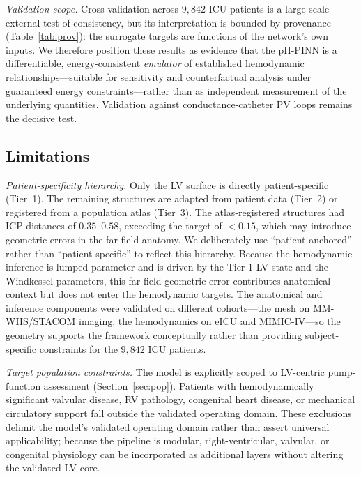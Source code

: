 \documentclass[journal]{IEEEtran}
\begin{document}
\emph{Validation scope.} Cross-validation across $9{,}842$ ICU patients is a large-scale external test of consistency, but its interpretation is bounded by provenance (Table~\ref{tab:prov}): the surrogate targets are functions of the network's own inputs. We therefore position these results as evidence that the pH-PINN is a differentiable, energy-consistent \emph{emulator} of established hemodynamic relationships---suitable for sensitivity and counterfactual analysis under guaranteed energy constraints---rather than as independent measurement of the underlying quantities. Validation against conductance-catheter PV loops remains the decisive test.

\subsection{Limitations}\label{sec:limits}
\emph{Patient-specificity hierarchy.} Only the LV surface is directly patient-specific (Tier~1). The remaining structures are adapted from patient data (Tier~2) or registered from a population atlas (Tier~3). The atlas-registered structures had ICP distances of $0.35$--$0.58$, exceeding the target of $<0.15$, which may introduce geometric errors in the far-field anatomy. We deliberately use ``patient-anchored'' rather than ``patient-specific'' to reflect this hierarchy. Because the hemodynamic inference is lumped-parameter and is driven by the Tier-1 LV state and the Windkessel parameters, this far-field geometric error contributes anatomical context but does not enter the hemodynamic targets. The anatomical and inference components were validated on different cohorts---the mesh on MM-WHS/STACOM imaging, the hemodynamics on eICU and MIMIC-IV---so the geometry supports the framework conceptually rather than providing subject-specific constraints for the $9{,}842$ ICU patients.

\emph{Target population constraints.} The model is explicitly scoped to LV-centric pump-function assessment (Section~\ref{sec:pop}). Patients with hemodynamically significant valvular disease, RV pathology, congenital heart disease, or mechanical circulatory support fall outside the validated operating domain. These exclusions delimit the model's validated operating domain rather than assert universal applicability; because the pipeline is modular, right-ventricular, valvular, or congenital physiology can be incorporated as additional layers without altering the validated LV core.
\end{document}
